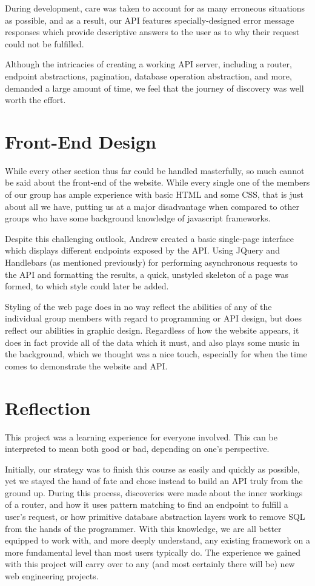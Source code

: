 \documentclass[12pt, a4paper, notitlepage]{report}
\begin{document}
		During development, care was taken to account for as many erroneous situations as possible, and as a result, our API features specially-designed error message responses which provide descriptive answers to the user as to why their request could not be fulfilled.
		
		Although the intricacies of creating a working API server, including a router, endpoint abstractions, pagination, database operation abstraction, and more, demanded a large amount of time, we feel that the journey of discovery was well worth the effort.
		
	\section*{Front-End Design}
		While every other section thus far could be handled masterfully, so much cannot be said about the front-end of the website. While every single one of the members of our group has ample experience with basic HTML and some CSS, that is just about all we have, putting us at a major disadvantage when compared to other groups who have some background knowledge of javascript frameworks.
		
		Despite this challenging outlook, Andrew created a basic single-page interface which displays different endpoints exposed by the API. Using JQuery and Handlebars (as mentioned previously) for performing asynchronous requests to the API and formatting the results, a quick, unstyled skeleton of a page was formed, to which style could later be added.
		
		Styling of the web page does in no way reflect the abilities of any of the individual group members with regard to programming or API design, but does reflect our abilities in graphic design. Regardless of how the website appears, it does in fact provide all of the data which it must, and also plays some music in the background, which we thought was a nice touch, especially for when the time comes to demonstrate the website and API.
		
	\section*{Reflection}
		This project was a learning experience for everyone involved. This can be interpreted to mean both good or bad, depending on one's perspective.
		
		Initially, our strategy was to finish this course as easily and quickly as possible, yet we stayed the hand of fate and chose instead to build an API truly from the ground up. During this process, discoveries were made about the inner workings of a router, and how it uses pattern matching to find an endpoint to fulfill a user's request, or how primitive database abstraction layers work to remove SQL from the hands of the programmer. With this knowledge, we are all better equipped to work with, and more deeply understand, any existing framework on a more fundamental level than most users typically do. The experience we gained with this project will carry over to any (and most certainly there will be) new web engineering projects.
		
\end{document}
